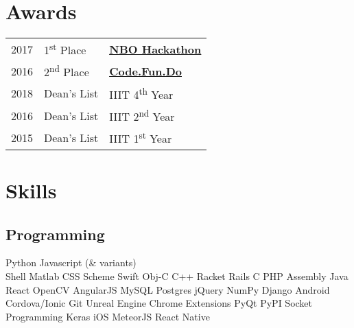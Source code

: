 \documentclass[]{deedy-resume-openfont}
\begin{document}
\begin{minipage}[t]{0.33\textwidth}
\section{Awards} 
\begin{tabular}{@{}lll}
2017	     & 1\textsuperscript{st} Place  & \textbf{\underline{\href{https://www.nbo.om/en/Pages/Competitions/NBO-Hackathon.aspx}{NBO Hackathon}}}\\
2016	     & 2\textsuperscript{nd} Place & \textbf{\underline{\href{https://www.acadaccelerator.com/}{Code.Fun.Do}}}\\
2018         & Dean's List  & IIIT 4\textsuperscript{th} Year\\
2016	     & Dean's List  & IIIT 2\textsuperscript{nd} Year\\
2015	     & Dean's List  & IIIT 1\textsuperscript{st} Year\\

\end{tabular}
\sectionsep


\section{Skills}
\subsection{Programming}
 Python \textbullet{} Javascript (\& variants) \\
Shell \textbullet{} Matlab \textbullet{} CSS
\textbullet{} Scheme 
\textbullet{} Swift 
\textbullet{} Obj-C
\textbullet{} C++ \textbullet{} Racket \textbullet{} Rails \textbullet{} C \textbullet{} PHP \textbullet{} Assembly  \textbullet{} Java   \\
React \textbullet{} OpenCV \textbullet{} AngularJS \textbullet{} MySQL \textbullet{} Postgres \textbullet jQuery \textbullet{} NumPy \textbullet{} Django \textbullet{} Android
\textbullet{} Cordova/Ionic \textbullet{} Git \textbullet{} Unreal Engine
\textbullet{} Chrome Extensions \textbullet{} PyQt \textbullet{} PyPI \textbullet{} Socket Programming \textbullet{} Keras \textbullet{} iOS \textbullet{} MeteorJS \textbullet{} React Native
\sectionsep



\end{minipage}
\end{document}
